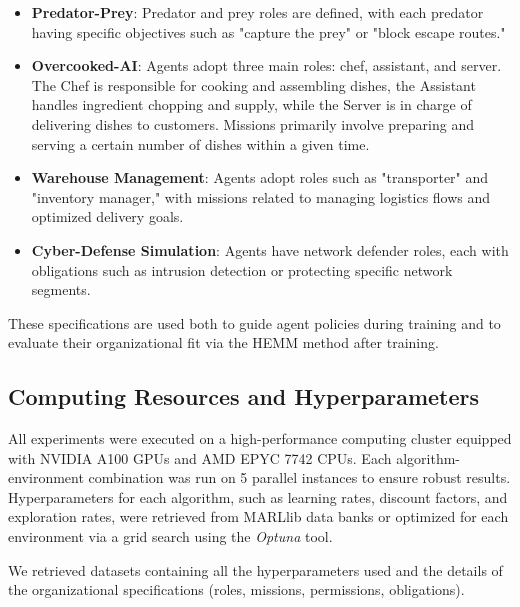 \documentclass[sigconf,anonymous]{aamas}
\begin{document}
\begin{itemize}
    \item \textbf{Predator-Prey}: Predator and prey roles are defined, with each predator having specific objectives such as "capture the prey" or "block escape routes."
    

    \item \textbf{Overcooked-AI}: Agents adopt three main roles: chef, assistant, and server. The Chef is responsible for cooking and assembling dishes, the Assistant handles ingredient chopping and supply, while the Server is in charge of delivering dishes to customers. Missions primarily involve preparing and serving a certain number of dishes within a given time.
    
    \item \textbf{Warehouse Management}: Agents adopt roles such as "transporter" and "inventory manager," with missions related to managing logistics flows and optimized delivery goals.
    
    \item \textbf{Cyber-Defense Simulation}: Agents have network defender roles, each with obligations such as intrusion detection or protecting specific network segments.
\end{itemize}

These specifications are used both to guide agent policies during training and to evaluate their organizational fit via the HEMM method after training.

\subsection{Computing Resources and Hyperparameters}

All experiments were executed on a high-performance computing cluster equipped with NVIDIA A100 GPUs and AMD EPYC 7742 CPUs. Each algorithm-environment combination was run on 5 parallel instances to ensure robust results. Hyperparameters for each algorithm, such as learning rates, discount factors, and exploration rates, were retrieved from MARLlib data banks or optimized for each environment via a grid search using the \textit{Optuna} tool.

We retrieved datasets containing all the hyperparameters used and the details of the organizational specifications (roles, missions, permissions, obligations). %
\end{document}
